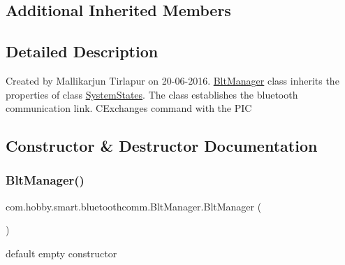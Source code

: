\subsection*{Additional Inherited Members}


\subsection{Detailed Description}
Created by Mallikarjun Tirlapur on 20-\/06-\/2016. \hyperlink{classcom_1_1hobby_1_1smart_1_1bluetoothcomm_1_1_blt_manager}{Blt\+Manager} class inherits the properties of class \hyperlink{classcom_1_1hobby_1_1smart_1_1bluetoothcomm_1_1_system_states}{System\+States}. The class establishes the bluetooth communication link. C\+Exchanges command with the P\+IC 

\subsection{Constructor \& Destructor Documentation}
\mbox{\label{classcom_1_1hobby_1_1smart_1_1bluetoothcomm_1_1_blt_manager_ab9428cea39cb30995d320fe4ef6efcde}} 
\subsubsection{\texorpdfstring{Blt\+Manager()}{BltManager()}\hspace{0.1cm}{\footnotesize\ttfamily [1/2]}}
{\footnotesize\ttfamily com.\+hobby.\+smart.\+bluetoothcomm.\+Blt\+Manager.\+Blt\+Manager (\begin{DoxyParamCaption}{ }\end{DoxyParamCaption})}

default empty constructor \mbox{\label{classcom_1_1hobby_1_1smart_1_1bluetoothcomm_1_1_blt_manager_a960eaa2dad2facecfab12da5408a63e9}} 
